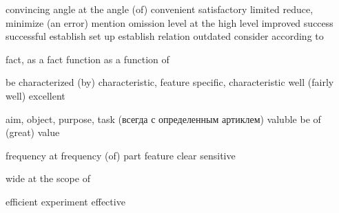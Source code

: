 \begin{multicols}{2}
	{convincing}
	{angle}
	{at the angle (of)}
	{convenient}
	{satisfactory}
	{limited}
	{reduce, minimize (an error)}
	{mention}
	{omission}
	{level}
	{at the high level}
	{improved}
	{success}
	{successful}
	{establish}
	{set up}
	{establish relation}
	{outdated}
	{consider}
	{according to}

	{fact, as a fact}
	{function}
	{as a function of}

	{be characterized (by)}
	{characteristic, feature}
	{specific, characteristic}
	{well (fairly well)}
	{excellent}

	{aim, object, purpose, task (всегда с определенным артиклем)}
	{valuble}
	{be of (great) value}

	{frequency}
	{at frequency (of)}
	{part}
	{feature}
	{clear}
	{sensitive}

	{wide}
	{at the scope of}

	{efficient}
	{experiment}
	{effective}
\end{multicols}